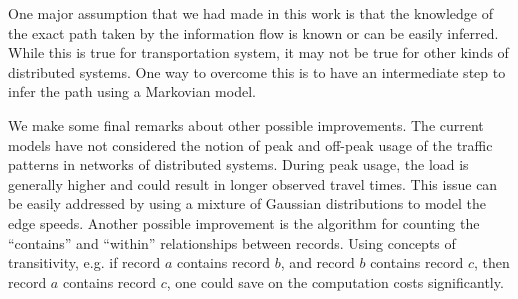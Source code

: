 \documentclass[conference]{IEEEtran.1.8}
\begin{document}
One major assumption that we had made in this work is that the knowledge of the exact path taken by the information flow is known or can be easily inferred. While this is true for transportation system, it may not be true for other kinds of distributed systems. One way to overcome this is to have an intermediate step to infer the path using a Markovian model. 

We make some final remarks about other possible improvements. The current models have not considered the notion of peak and off-peak usage of the traffic patterns in networks of distributed systems. During peak usage, the load is generally higher and could result in longer observed travel times. This issue can be easily addressed by using a mixture of Gaussian distributions to model the edge speeds. Another possible improvement is the algorithm for counting the ``contains'' and ``within'' relationships between records. Using concepts of transitivity, e.g. if record $a$ contains record $b$, and record $b$ contains record $c$, then record $a$ contains record $c$, one could save on the computation costs significantly.





\end{document}
